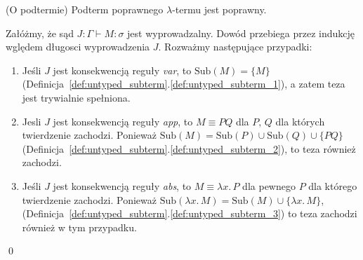 \begin{lemat}(O podtermie)\label{thm:subterm}
  Podterm poprawnego \(\lambda\)-termu jest poprawny.
\end{lemat}
\begin{dowod}
  Załóżmy, że sąd \(J: \Gamma\vdash M:\sigma\) jest wyprowadzalny. Dowód przebiega przez indukcję wględem długosci wyprowadzenia \(J\). Rozważmy następujące przypadki:
  \begin{enumerate}[label=(\alph*)]
    \setlength\itemsep{0em}
    \item Jeśli \(J\) jest konsekwencją reguły \emph{var}, to \(\mathrm{Sub}(M)=\{M\}\) (Definicja~\ref{def:untyped_subterm}.\ref{def:untyped_subterm_1}), a zatem teza jest trywialnie spełniona.
     \item Jesli \(J\) jest konsekwencją reguły \emph{app}, to \(M\equiv PQ\) dla \(P,\,Q\) dla których twierdzenie zachodzi. Ponieważ \(\mathrm{Sub}(M)=\mathrm{Sub}(P)\cup\mathrm{Sub}(Q)\cup\{PQ\}\) (Definicja~\ref{def:untyped_subterm}.\ref{def:untyped_subterm_2}), to teza również zachodzi.
    \item Jeśli \(J\) jest konsekwencją reguły \emph{abs}, to \(M\equiv \lambda
      x.\,P\) dla pewnego \(P\) dla którego twierdzenie zachodzi. Ponieważ
      \(\mathrm{Sub}(\lambda x.\,M) = \mathrm{Sub}(M) \cup \{\lambda x.\,M\}\),
      (Definicja~\ref{def:untyped_subterm}.\ref{def:untyped_subterm_3})
      to teza zachodzi również w tym przypadku.
  \end{enumerate}
  \qed
\end{dowod}

